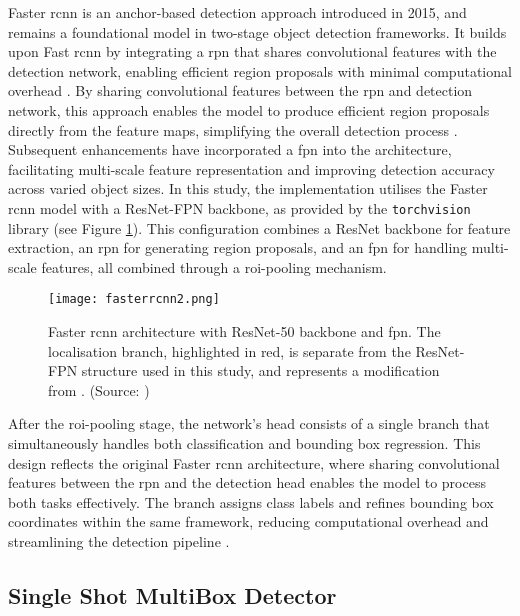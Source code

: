 Faster \gls{rcnn} \cite{fasterrcnn} is an anchor-based detection approach introduced in 2015, and remains a foundational model in two-stage object detection frameworks. It builds upon Fast \gls{rcnn} \cite{fastrcnn} by integrating a \gls{rpn} that shares convolutional features with the detection network, enabling efficient region proposals with minimal computational overhead \cite{fasterrcnn}. By sharing convolutional features between the \gls{rpn} and detection network, this approach enables the model to produce efficient region proposals directly from the feature maps, simplifying the overall detection process \cite{fasterrcnn}.
Subsequent enhancements have incorporated a \gls{fpn} into the architecture, facilitating multi-scale feature representation and improving detection accuracy across varied object sizes. In this study, the implementation utilises the Faster \gls{rcnn} model with a ResNet-FPN backbone, as provided by the \verb|torchvision| library (see Figure \ref{fig:fasterrcnn2}). This configuration combines a ResNet backbone for feature extraction, an \gls{rpn} for generating region proposals, and an \gls{fpn} for handling multi-scale features, all combined through a \gls{roi}-pooling mechanism.

\begin{figure}[!htbp]
    \centering
    \texttt{[image: fasterrcnn2.png]}
    \caption{Faster \gls{rcnn} architecture with ResNet-50 backbone and \gls{fpn}. The localisation branch, highlighted in red, is separate from the ResNet-FPN structure used in this study, and represents a modification from \cite{fasterrcnn_diagram}. (Source: \cite{fasterrcnn_diagram})}
    \label{fig:fasterrcnn2}
\end{figure}

After the \gls{roi}-pooling stage, the network’s head consists of a single branch that simultaneously handles both classification and bounding box regression. This design reflects the original Faster \gls{rcnn} architecture, where sharing convolutional features between the \gls{rpn} and the detection head enables the model to process both tasks effectively. The branch assigns class labels and refines bounding box coordinates within the same framework, reducing computational overhead and streamlining the detection pipeline \cite{fasterrcnn}.

\subsection{Single Shot MultiBox Detector}
\label{subsec:4_ssd}

